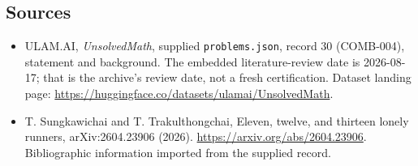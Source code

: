 \documentclass[11pt,a4paper]{article}
\begin{document}
\subsection{Sources}

{\small

\begin{itemize}

\item[\hypertarget{source:30:1}{S1}] ULAM.AI, \emph{UnsolvedMath}, supplied \texttt{problems.json}, record 30 (COMB-004), statement and background. The embedded literature-review date is 2026-08-17; that is the archive’s review date, not a fresh certification. Dataset landing page: \url{https://huggingface.co/datasets/ulamai/UnsolvedMath}.

\item[\hypertarget{source:30:2}{S2}] T. Sungkawichai and T. Trakulthongchai, Eleven, twelve, and thirteen lonely runners, arXiv:2604.23906 (2026). \url{https://arxiv.org/abs/2604.23906}. Bibliographic information imported from the supplied record.

\end{itemize}

}

\label{end:30}
\end{document}

